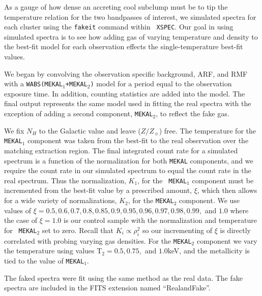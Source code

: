 \documentclass[preprint]{aastex}
\begin{document}
As a gauge of how dense an accreting cool subclump must be to tip the
temperature relation for the two bandpasses of interest, we simulated
spectra for each cluster using the {\tt fakeit} command within {\tt
XSPEC}. Our goal in using simulated spectra is to see how adding gas
of varying temperature and density to the best-fit model for each
observation effects the single-temperature best-fit values.

We began by convolving the observation specific background, ARF, and RMF
with a {\tt WABS(MEKAL$_{1}$+MEKAL$_{2}$)} model for a period equal to
the observation exposure time. In addition, counting statistics are
added into the model. The final output represents the same model
used in fitting the real spectra with the exception of adding a second
component, {\tt MEKAL$_{2}$}, to reflect the fake gas.

We fix $N_H$ to the Galactic value and leave ($Z/Z_{\sun}$) free. The
temperature for the {\tt MEKAL$_{1}$} component was taken from the
best-fit to the real observation over the matching extraction
region. The final integrated count rate for a simulated spectrum
is a function of the normalization for both {\tt MEKAL} components,
and we require the count rate in our simulated spectrum to equal
the count rate in the real spectrum. Thus the normalization, $K_1$, for the {\tt
MEKAL$_{1}$} component must be incremented from the best-fit value by a
prescribed amount, $\xi$, which then allows for a wide variety of
normalizations, $K_2$, for the {\tt MEKAL$_2$} component. We use
values of $\xi = 0.5, 0.6, 0.7, 0.8, 0.85, 0.9, 0.95, 0.96, 0.97,
0.98, 0.99,$ and $1.0$ where the case of $\xi=1.0$ is our
control sample with the normalization and temperature for {\tt
MEKAL$_2$} set to zero. Recall that
$K_i \propto \rho_{i}^2$ so our incrementing of $\xi$ is directly
correlated with probing varying gas densities. For the {\tt MEKAL$_2$} component we vary
the temperature using values T$_2 = 0.5, 0.75, $ and $1.0$keV,
and the metallicity is tied to the value of {\tt MEKAL$_1$}.

The faked spectra were fit using the same method as the real data. The
fake spectra are included in the FITS extension named ``RealandFake''.


\end{document}
